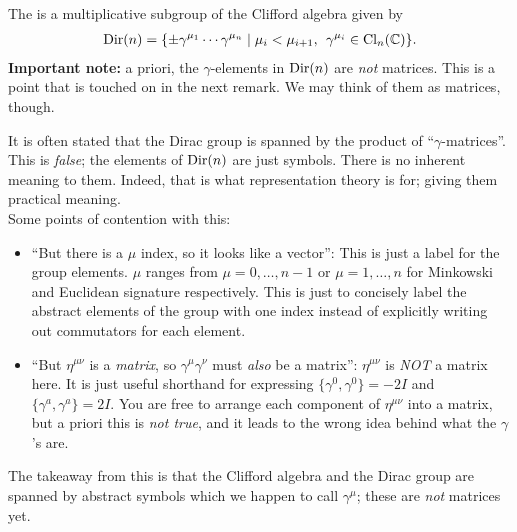 \documentclass[11pt]{article}
\begin{document}
\begin{definition}
    The  is a multiplicative subgroup of the Clifford algebra
    given by 
    \begin{align*}
        {\rm Dir}(n) = \{ \pm \gamma^{\mu_1} \cdots \gamma^{\mu_n} \mid \mu_i < \mu_{i + 1}, \: \: \gamma^{\mu_i} \in \operatorname{Cl}_n(\mathbb{C}) \}.
    \end{align*}
    \textbf{Important note:} a priori, the $\gamma$-elements in ${\rm Dir}(n)$
    are \emph{not} matrices. This is a point that is touched on in the
    next remark. We may think of them as matrices, though.
\end{definition}

\begin{reemark}
    It is often stated that the Dirac group is spanned by the product of
    ``$\gamma$-matrices''. This is \emph{false}; the elements of ${\rm Dir}(n)$
    are just symbols. There is no inherent meaning to them. Indeed, that 
    is what representation theory is for; giving them practical meaning.\\

    \noin
    Some points of contention with this:
    \begin{itemize}
        \item ``But there is a $\mu$ index, so it looks like a vector'':
        This is just a label for the group elements. $\mu$ ranges from
        $\mu = 0, \ldots, n - 1$ or $\mu = 1, \ldots, n$ for Minkowski and
        Euclidean signature respectively. This is just to concisely label the
        abstract elements of the group with one index instead of explicitly
        writing out commutators for each element.
        \item ``But $\eta^{\mu \nu}$ is a \emph{matrix}, so $\gamma^\mu \gamma^\nu$
        must \emph{also} be a matrix'': $\eta^{\mu \nu}$ is \emph{NOT} a matrix
        here. It is just useful shorthand for expressing $\{ \gamma^0, \gamma^0 \} = - 2I$
        and $\{ \gamma^a, \gamma^a \} = 2 I$. You are free to arrange each component
        of $\eta^{\mu \nu}$ into a matrix, but a priori this is \emph{not true}, and it leads
        to the wrong idea behind what the $\gamma$'s are.
    \end{itemize}
    The takeaway from this is that the Clifford algebra and the Dirac group are
    spanned by abstract symbols which we happen to call $\gamma^\mu$; these are
    \emph{not} matrices yet.\\


\end{reemark}
\end{document}
